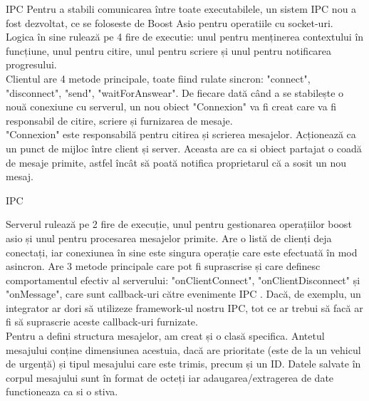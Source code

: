 \documentclass{beamer}
\begin{document}
    \begin{frame}{IPC}
        Pentru a stabili comunicarea între toate executabilele, un sistem IPC nou
        a fost dezvoltat, ce se foloseste de Boost Asio pentru operatiile cu socket-uri.
        Logica în sine rulează pe 4 fire de executie: unul pentru menținerea contextului
        în funcțiune, unul pentru citire, unul pentru scriere și unul
        pentru notificarea progresului. \\
        Clientul are 4 metode principale, toate fiind rulate sincron:
        "connect", "disconnect", "send", "waitForAnswear". De fiecare dată când a
        se stabilește o nouă conexiune cu serverul, un nou obiect "Connexion"
        va fi creat care va fi responsabil de citire, scriere
        și furnizarea de mesaje.\\
        "Connexion" este responsabilă pentru citirea și scrierea mesajelor.
        Acționează ca un punct de mijloc între client și server. Aceasta
        are ca si obiect partajat o coadă de mesaje primite, astfel
        încât să poată notifica proprietarul că a sosit un nou mesaj. \\
    \end{frame}
    \begin{frame}{IPC}

        Serverul rulează pe 2 fire de execuție, unul pentru gestionarea
        operațiilor boost asio și unul pentru procesarea mesajelor primite.
        Are o listă de clienți deja conectați, iar conexiunea în sine este
        singura operație care este efectuată în mod asincron. Are 3 metode
        principale care pot fi suprascrise și care definesc comportamentul
        efectiv al serverului: "onClientConnect", "onClientDisconnect" și
        "onMessage", care sunt callback-uri către evenimente IPC
        . Dacă, de exemplu, un integrator ar dori să utilizeze framework-ul
        nostru IPC, tot ce ar trebui să facă ar fi să suprascrie aceste
        callback-uri furnizate.\\

        Pentru a defini structura mesajelor, am creat și o clasă
        specifica. Antetul mesajului conține dimensiunea acestuia,
        dacă are prioritate (este de la un vehicul de urgență) și tipul
        mesajului care este trimis, precum și un ID. Datele salvate în
        corpul mesajului sunt în format de octeți iar adaugarea/extragerea de date 
        functioneaza ca si o stiva.
    \end{frame}
\end{document}
